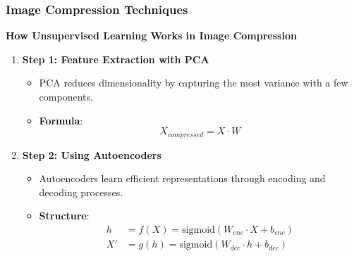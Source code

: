 \documentclass[aspectratio=169]{beamer}
\begin{document}
\begin{frame}[fragile]
    \frametitle{Image Compression Techniques}
    \textbf{How Unsupervised Learning Works in Image Compression}

    \begin{enumerate}
        \item \textbf{Step 1: Feature Extraction with PCA}
            \begin{itemize}
                \item PCA reduces dimensionality by capturing the most variance with a few components.
                \item \textbf{Formula}:
                \begin{equation}
                X_{compressed} = X \cdot W
                \end{equation}
            \end{itemize}

        \item \textbf{Step 2: Using Autoencoders}
            \begin{itemize}
                \item Autoencoders learn efficient representations through encoding and decoding processes.
                \item \textbf{Structure}:
                \begin{align*}
                h &= f(X) = \text{sigmoid}(W_{enc} \cdot X + b_{enc}) \\
                X' &= g(h) = \text{sigmoid}(W_{dec} \cdot h + b_{dec})
                \end{align*}
            \end{itemize}
    \end{enumerate}
\end{frame}
\end{document}
